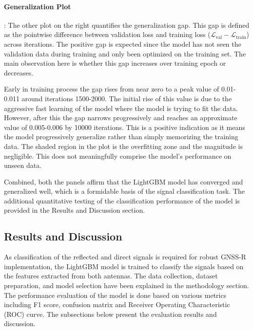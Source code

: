 \documentclass[12pt, a4paper]{article}
\begin{document}
\paragraph{Generalization Plot}:
The other plot on the right quantifies the generalization gap. This gap is defined as
the pointwise difference between validation loss and training loss ($\mathcal{L}_{\text{val}} - 
\mathcal{L}_{\text{train}}$) across iterations. The positive gap is expected since the model 
has not seen the validation data during training and only been optimized on the training set. The main 
observation here is whether this gap increases over training epoch or decreases. 

Early in training process the gap rises from near zero to a peak value of 0.01-0.011 around iterations
1500-2000. The initial rise of this value is due to the aggressive fast learning of the model where the model 
is trying to fit the data. However, after this the gap narrows progressively and reaches an approximate value of 0.005-0.006
by 10000 iterations. This is a positive indication as it means the model progressively generalize rather than simply 
memorizing the training data. The shaded region in the plot is the overfitting zone and the magnitude is negligible. This does not 
meaningfully comprise the model's performance on unseen data.

Combined, both the panels affirm that the LightGBM model has converged and generalized well, 
which is a formidable basis of the signal classification task. The additional quantitative testing of the classification 
performance of the model is provided in the Results and Discussion section.

\subsection{Results and Discussion}
As classification of the reflected and direct signals is required for robust GNSS-R
implementation, the LightGBM model is trained to classify the signals based on
the features extracted from both antennas. The data collection, dataset preparation, and model
selection have been explained in the methodology section. The performance evaluation of the model is done
based on various metrics including F1 score, confusion matrix and Receiver Operating Characteristic (ROC) curve. The subsections
below present the evaluation results and discussion.
\end{document}
